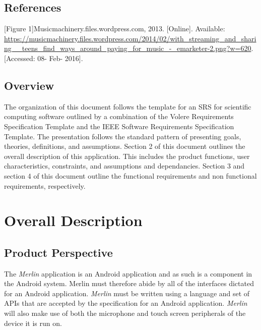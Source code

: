 \documentclass[]{article}
\newcommand{\merlin}{\textit{Merlin }}
\begin{document}
\subsection{References}
\label{sub:references}
\cbstart

[Figure 1]Musicmachinery.files.wordpress.com, 2013. [Online]. Available: \url{https://musicmachinery.files.wordpress.com/2014/02/with_streaming_and_sharing__teens_find_ways_around_paying_for_music_-_emarketer-2.png?w=620}. [Accessed: 08- Feb- 2016].
\cbend

\subsection{Overview}
\label{sub:overview}
	The organization of this document follows the template for an SRS for scientific computing software outlined by a combination of the Volere Requirements Specification Template and the IEEE Software Requirements Specification Template. The presentation follows the standard pattern of presenting goals, theories, definitions, and assumptions. Section 2 of this document outlines the overall description of this application. This includes the product functions, user characteristics, constraints, and assumptions and dependancies. Section 3 and section 4 of this document outline the functional requirements and non functional requirements, respectively.


\section{Overall Description}
\label{sec:overall_description}

\subsection{Product Perspective}
\label{sub:product_perspective}
The \merlin application is an Android application and as such is a component in the Android system. Merlin must therefore abide by all of the interfaces dictated for an Android application. \merlin must be written using a language and set of APIs that are accepted by the specification for an Android application. \merlin will also make use of both the microphone and touch screen peripherals of the device it is run on.
\end{document}
